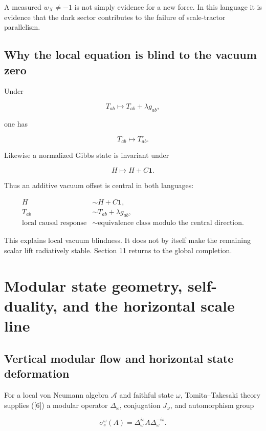 \documentclass[
  11pt,
  letterpaper,
]{article}
\begin{document}
A measured \(w_X\neq-1\) is not simply evidence for a new force. In this
language it is evidence that the dark sector contributes to the failure
of scale-tractor parallelism.

\subsection{Why the local equation is blind to the vacuum
zero}\label{why-the-local-equation-is-blind-to-the-vacuum-zero}

Under

\[
T_{ab}\mapsto T_{ab}+\lambda g_{ab},
\]

one has

\[
T^{\circ}_{ab}\mapsto T^{\circ}_{ab}.
\]

Likewise a normalized Gibbs state is invariant under

\[
H\mapsto H+C\mathbf 1.
\]

Thus an additive vacuum offset is central in both languages:

\[
\boxed{
\begin{aligned}
H&\sim H+C\mathbf1,\\
T_{ab}&\sim T_{ab}+\lambda g_{ab},\\
\text{local causal response}&\sim\text{equivalence class modulo the central direction}.
\end{aligned}}
\]

This explains local vacuum blindness. It does not by itself make the
remaining scalar lift radiatively stable. Section 11 returns to the
global completion.

\section{Modular state geometry, self-duality, and the horizontal scale
line}\label{modular-state-geometry-self-duality-and-the-horizontal-scale-line}

\subsection{Vertical modular flow and horizontal state
deformation}\label{vertical-modular-flow-and-horizontal-state-deformation}

For a local von Neumann algebra \(\mathcal A\) and faithful state
\(\omega\), Tomita--Takesaki theory supplies ({[}6{]}) a modular
operator \(\Delta_\omega\), conjugation \(J_\omega\), and automorphism
group

\[
\sigma_s^\omega(A)=\Delta_\omega^{is}A\Delta_\omega^{-is}.
\]
\end{document}
